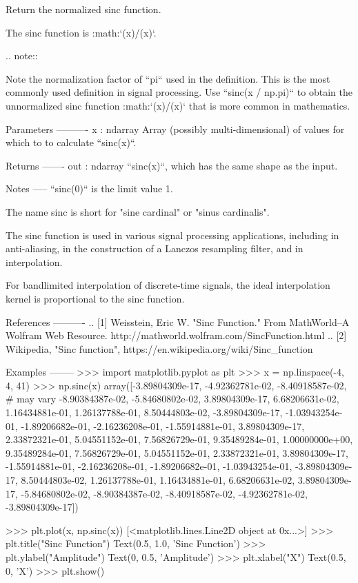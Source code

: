 \begin{DoxyVerb}Return the normalized sinc function.

The sinc function is :math:`\sin(\pi x)/(\pi x)`.

.. note::

    Note the normalization factor of ``pi`` used in the definition.
    This is the most commonly used definition in signal processing.
    Use ``sinc(x / np.pi)`` to obtain the unnormalized sinc function
    :math:`\sin(x)/(x)` that is more common in mathematics.

Parameters
----------
x : ndarray
    Array (possibly multi-dimensional) of values for which to to
    calculate ``sinc(x)``.

Returns
-------
out : ndarray
    ``sinc(x)``, which has the same shape as the input.

Notes
-----
``sinc(0)`` is the limit value 1.

The name sinc is short for "sine cardinal" or "sinus cardinalis".

The sinc function is used in various signal processing applications,
including in anti-aliasing, in the construction of a Lanczos resampling
filter, and in interpolation.

For bandlimited interpolation of discrete-time signals, the ideal
interpolation kernel is proportional to the sinc function.

References
----------
.. [1] Weisstein, Eric W. "Sinc Function." From MathWorld--A Wolfram Web
       Resource. http://mathworld.wolfram.com/SincFunction.html
.. [2] Wikipedia, "Sinc function",
       https://en.wikipedia.org/wiki/Sinc_function

Examples
--------
>>> import matplotlib.pyplot as plt
>>> x = np.linspace(-4, 4, 41)
>>> np.sinc(x)
 array([-3.89804309e-17,  -4.92362781e-02,  -8.40918587e-02, # may vary
        -8.90384387e-02,  -5.84680802e-02,   3.89804309e-17,
        6.68206631e-02,   1.16434881e-01,   1.26137788e-01,
        8.50444803e-02,  -3.89804309e-17,  -1.03943254e-01,
        -1.89206682e-01,  -2.16236208e-01,  -1.55914881e-01,
        3.89804309e-17,   2.33872321e-01,   5.04551152e-01,
        7.56826729e-01,   9.35489284e-01,   1.00000000e+00,
        9.35489284e-01,   7.56826729e-01,   5.04551152e-01,
        2.33872321e-01,   3.89804309e-17,  -1.55914881e-01,
       -2.16236208e-01,  -1.89206682e-01,  -1.03943254e-01,
       -3.89804309e-17,   8.50444803e-02,   1.26137788e-01,
        1.16434881e-01,   6.68206631e-02,   3.89804309e-17,
        -5.84680802e-02,  -8.90384387e-02,  -8.40918587e-02,
        -4.92362781e-02,  -3.89804309e-17])

>>> plt.plot(x, np.sinc(x))
[<matplotlib.lines.Line2D object at 0x...>]
>>> plt.title("Sinc Function")
Text(0.5, 1.0, 'Sinc Function')
>>> plt.ylabel("Amplitude")
Text(0, 0.5, 'Amplitude')
>>> plt.xlabel("X")
Text(0.5, 0, 'X')
>>> plt.show()\end{DoxyVerb}
